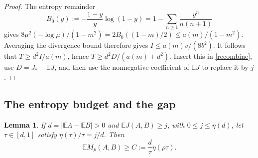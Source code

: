 \documentclass[11pt]{article}
\newtheorem{lemma}[theorem]{Lemma}
\newcommand{\E}{\mathbb E}\newcommand{\Prb}{\mathbb P}
\numberwithin{equation}{section}
\begin{document}
\begin{proof}
The entropy remainder
\begin{equation}\label{remainder}
 B_0(y):=-\frac{1-y}{y}\log(1-y)
 =1-\sum_{n\ge1}\frac{y^n}{n(n+1)}
\end{equation}
gives $8\mu^2(-\log\mu)/(1-m^2)=2B_0((1-m)/2)\le a(m)/(1-m^2)$. Averaging the divergence bound therefore gives $I\le a(m)v/(8b^2)$. It follows that $T\ge d^2I/a(m)$, hence $T\ge d^2D/(a(m)+d^2)$. Insert this in \eqref{recombine}, use $D=J_*-\E J$, and then use the nonnegative coefficient of $\E J$ to replace it by $j$.
\end{proof}

\subsection{The entropy budget and the gap}
\begin{lemma}\label{budget}
If $d=|\E A-\E B|>0$ and $\E J(A,B)\ge j$, with $0\le j\le\eta(d)$, let $\tau\in[d,1]$ satisfy $\eta(\tau)/\tau=j/d$. Then
\begin{equation}\label{Cbound}
 \E M_p(A,B)\ge C:=\frac d\tau\eta(\rho\tau).
\end{equation}
\end{lemma}
\end{document}
